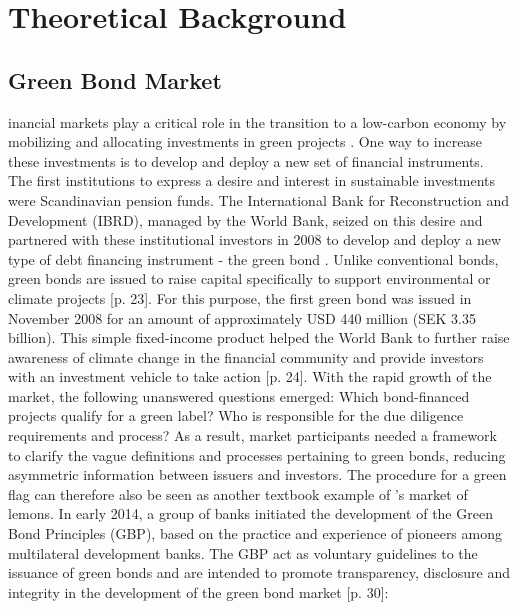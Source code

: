 %
%
\let\textcircled=\pgftextcircled
\chapter{Theoretical Background}
\label{chap:intro}

\section{Green Bond Market}
inancial markets play a critical role in the transition to a low-carbon economy by mobilizing and allocating investments in green projects \citep[p. 3]{oecd2021}. One way to increase these investments is to develop and deploy a new set of financial instruments. The first institutions to express a desire and interest in sustainable investments were Scandinavian pension funds. The International Bank for Reconstruction and Development (IBRD), managed by the World Bank, seized on this desire and partnered with these institutional investors in 2008 to develop and deploy a new type of debt financing instrument - the green bond \citep[p. 24]{worldbank2015}. Unlike conventional bonds, green bonds are issued to raise capital specifically to support environmental or climate projects [p. 23]. For this purpose, the first green bond was issued in November 2008 for an amount of approximately USD 440 million (SEK 3.35 billion). This simple fixed-income product helped the World Bank to further raise awareness of climate change in the financial community and provide investors with an investment vehicle to take action [p. 24]. With the rapid growth of the market, the following unanswered questions emerged: Which bond-financed projects qualify for a green label? Who is responsible for the due diligence requirements and process? As a result, market participants needed a framework to clarify the vague definitions and processes pertaining to green bonds, reducing asymmetric information between issuers and investors. The procedure for a green flag can therefore also be seen as another textbook example of \cite{akerlof1970market}'s market of lemons. In early 2014, a group of banks initiated the development of the Green Bond Principles (GBP), based on the practice and experience of pioneers among multilateral development banks. The GBP act as voluntary guidelines to the issuance of green bonds and are intended to promote transparency, disclosure and integrity in the development of the green bond market [p. 30]:
 
